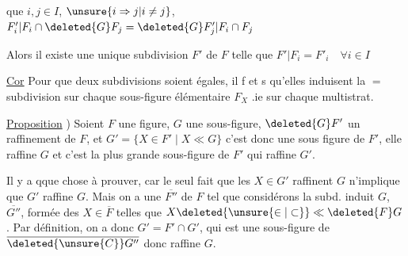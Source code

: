 
que  $i,j\in I$, $\unsure{i\Rightarrow j|i\ne j}$, $F'_i|F_i\cap\deleted{G}F_j=\deleted{G}F'_j|F_i\cap F_j$

Alors il existe une unique subdivision $F'$ de $F$ telle que $F'|F_i=F'_i\quad\forall i\in I$

\uline{Cor} Pour que deux subdivisions  soient égales, il f et s qu'elles induisent la $=$ subdivision sur chaque sous-figure élémentaire $F_X$ .ie sur chaque multistrat.

 \uline{Proposition} ) Soient $F$ une figure, $G$ une sous-figure, $\deleted{G}F'$ un raffinement de $F$, et $G'=\{X\in F'\mid X\ll G\}$ c'est donc une sous figure de $F'$,  elle raffine $G$ et c'est  la plus grande sous-figure de $F'$ qui raffine $G'$.



 Il y a qque chose à prouver, car le seul fait que les $X\in G'$ raffinent $G$ n'implique  que $G'$ raffine $G$. Mais on a une   $\overline{F''}$ de $F$ tel que  considérons la subd. induit  $G$, $\overline{G''}$, formée des $X\in\overline{F}$ telles que $X\deleted{\unsure{\in|\subset}}\ll \deleted{F}G$.  Par définition, on a donc $G'=F'\cap G'$, qui est  une sous-figure de $\overline{\deleted{\unsure{C}}G''}$ donc raffine $G$.
